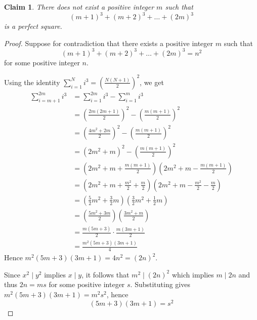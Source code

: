 \documentclass{article}
\newtheorem*{claim}{Claim}
\begin{document}
\begin{claim}
    There does not exist a positive integer $m$ such that
    \[
    (m+1)^3 + (m+2)^3 + \dots + (2m)^3
    \]
    is a perfect square.
\end{claim}

\begin{proof}
    Suppose for contradiction that there exists a positive integer $m$ such that
    \[
    (m+1)^3 + (m+2)^3 + \dots + (2m)^3 = n^2
    \]
    for some positive integer $n$.

    \medskip

    Using the identity $\sum_{i=1}^{N} i^3 = \left(\frac{N(N+1)}{2}\right)^2$, we get
    \[
    \begin{aligned}
        \sum_{i=m+1}^{2m} i^3
        &= \sum_{i=1}^{2m} i^3 - \sum_{i=1}^{m} i^3 \\
        &= \left(\frac{2m(2m+1)}{2}\right)^2 - \left(\frac{m(m+1)}{2}\right)^2 \\
        &= \left(\frac{4m^2+2m}{2}\right)^2 - \left(\frac{m(m+1)}{2}\right)^2 \\
        &= (2m^2+m)^2 - \left(\frac{m(m+1)}{2}\right)^2 \\
        &= \left(2m^2 + m + \frac{m(m+1)}{2}\right)\left(2m^2 + m - \frac{m(m+1)}{2}\right) \\
        &= \left(2m^2 + m + \frac{m^2}{2} + \frac{m}{2}\right)\left(2m^2 + m - \frac{m^2}{2} - \frac{m}{2}\right) \\
        &= \left(\frac{5}{2}m^2 + \frac{3}{2}m\right)\left(\frac{3}{2}m^2 + \frac{1}{2}m\right) \\
        &= \left(\frac{5m^2 + 3m}{2}\right)\left(\frac{3m^2 + m}{2}\right) \\
        &= \frac{m(5m+3)}{2} \cdot \frac{m(3m+1)}{2} \\
        &= \frac{m^2(5m+3)(3m+1)}{4}
    \end{aligned}
    \]
    Hence $m^2(5m+3)(3m+1) = 4n^2 = (2n)^2$.

    \medskip

    Since $x^2 \mid y^2$ implies $x \mid y$, it follows that $m^2 \mid (2n)^2$ which implies $m \mid 2n$ and thus $2n 
    = ms$ for some positive integer $s$. Substituting gives $m^2(5m+3)(3m+1) = m^2s^2$, hence
    \[
    (5m+3)(3m+1) = s^2
    \]

    \medskip


\end{proof}
\end{document}
